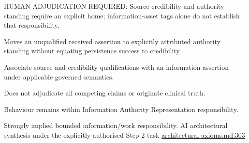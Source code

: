 HUMAN ADJUDICATION REQUIRED: Source credibility and authority standing require an explicit home; information-asset tags alone do not establish that responsibility.



Moves an unqualified received assertion to explicitly attributed authority standing without equating persistence success to credibility.



Associate source and credibility qualifications with an information assertion under applicable governed semantics.



Does not adjudicate all competing claims or originate clinical truth.



Behaviour remains within Information Authority Representation responsibility.


Strongly implied bounded information/work responsibility. AI architectural synthesis under the explicitly authorised Step 2 task \hyperref[evidence:27549d51551beae6]{architectural-axioms.md:303}
